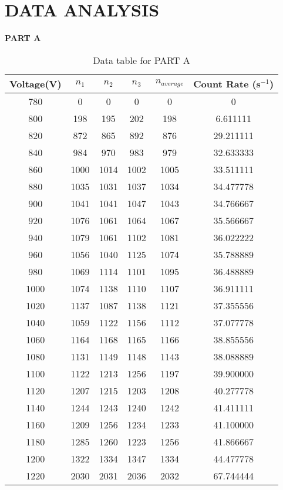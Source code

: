 \documentclass[a4paper,11pt]{article}
\begin{document}
\section*{\center DATA ANALYSIS}
\label{sec:DATA ANALYSIS}
\noindent \textbf{PART A}
\begin{table}[h!]
\centering
\begin{tabular}{ |c|c|c|c|c|c| } 
\hline
Voltage(V) & $n_1$ & $n_2$ & $n_3$ & $n_{average}$ & Count Rate (s$^{-1}$) \\
\hline
780 & 0 & 0 & 0 & 0 & 0 \\
\hline
800 & 198 & 195 & 202 & 198 & 6.611111 \\
\hline
820 & 872 & 865 & 892 & 876 & 29.211111 \\
\hline
840 & 984 & 970 & 983 & 979 & 32.633333 \\
\hline
860 & 1000 & 1014 & 1002 & 1005 & 33.511111 \\
\hline
880 & 1035 & 1031 & 1037 & 1034 & 34.477778 \\
\hline
900 & 1041 & 1041 & 1047 & 1043 & 34.766667 \\
\hline
920 & 1076 & 1061 & 1064 & 1067 & 35.566667 \\
\hline
940 & 1079 & 1061 & 1102 & 1081 & 36.022222 \\
\hline
960 & 1056 & 1040 & 1125 & 1074 & 35.788889 \\
\hline
980 & 1069 & 1114 & 1101 & 1095 & 36.488889 \\
\hline
1000 & 1074 & 1138 & 1110 & 1107 & 36.911111 \\
\hline
1020 & 1137 & 1087 & 1138 & 1121 & 37.355556 \\
\hline
1040 & 1059 & 1122 & 1156 & 1112 & 37.077778 \\
\hline
1060 & 1164 & 1168 & 1165 & 1166 & 38.855556 \\
\hline
1080 & 1131 & 1149 & 1148 & 1143 & 38.088889 \\
\hline
1100 & 1122 & 1213 & 1256 & 1197 & 39.900000 \\
\hline
1120 & 1207 & 1215 & 1203 & 1208 & 40.277778 \\
\hline
1140 & 1244 & 1243 & 1240 & 1242 & 41.411111 \\
\hline
1160 & 1209 & 1256 & 1234 & 1233 & 41.100000 \\
\hline
1180 & 1285 & 1260 & 1223 & 1256 & 41.866667 \\
\hline
1200 & 1322 & 1334 & 1347 & 1334 & 44.477778 \\
\hline
1220 & 2030 & 2031 & 2036 & 2032 & 67.744444 \\
\hline
\end{tabular}
\caption{Data table for PART A}
\label{table:1}
\end{table}
\end{document}
